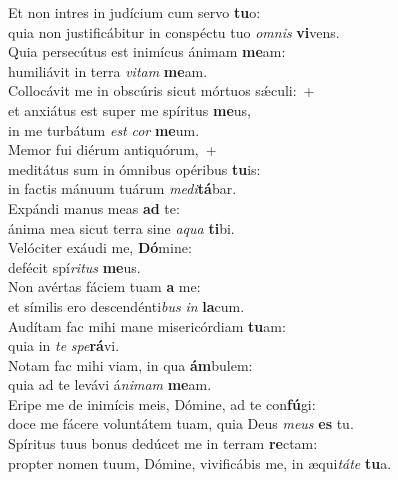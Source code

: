 \evenverse Et non intres in judícium cum servo \textbf{tu}o:~\*\\
\evenverse quia non justificábitur in conspéctu tuo \textit{om}\textit{nis} \textbf{vi}vens.\\
\oddverse Quia persecútus est inimícus ánimam \textbf{me}am:~\*\\
\oddverse humiliávit in terra \textit{vi}\textit{tam} \textbf{me}am.\\
\evenverse Collocávit me in obscúris sicut mórtuos sǽculi:~+\\
\evenverse  et anxiátus est super me spíritus \textbf{me}us,~\*\\
\evenverse in me turbátum \textit{est} \textit{cor} \textbf{me}um.\\
\oddverse Memor fui diérum antiquórum,~+\\
\oddverse  meditátus sum in ómnibus opéribus \textbf{tu}is:~\*\\
\oddverse in factis mánuum tuárum \textit{me}\textit{di}\textbf{tá}bar.\\
\evenverse Expándi manus meas \textbf{ad} te:~\*\\
\evenverse ánima mea sicut terra sine \textit{a}\textit{qua} \textbf{ti}bi.\\
\oddverse Velóciter exáudi me, \textbf{Dó}mine:~\*\\
\oddverse defécit spí\textit{ri}\textit{tus} \textbf{me}us.\\
\evenverse Non avértas fáciem tuam \textbf{a} me:~\*\\
\evenverse et símilis ero descendénti\textit{bus} \textit{in} \textbf{la}cum.\\
\oddverse Audítam fac mihi mane misericórdiam \textbf{tu}am:~\*\\
\oddverse quia in \textit{te} \textit{spe}\textbf{rá}vi.\\
\evenverse Notam fac mihi viam, in qua \textbf{ám}bulem:~\*\\
\evenverse quia ad te levávi á\textit{ni}\textit{mam} \textbf{me}am.\\
\oddverse Eripe me de inimícis meis, Dómine, ad te con\textbf{fú}gi:~\*\\
\oddverse doce me fácere voluntátem tuam, quia Deus \textit{me}\textit{us} \textbf{es} tu.\\
\evenverse Spíritus tuus bonus dedúcet me in terram \textbf{re}ctam:~\*\\
\evenverse propter nomen tuum, Dómine, vivificábis me, in æqui\textit{tá}\textit{te} \textbf{tu}a.\\
